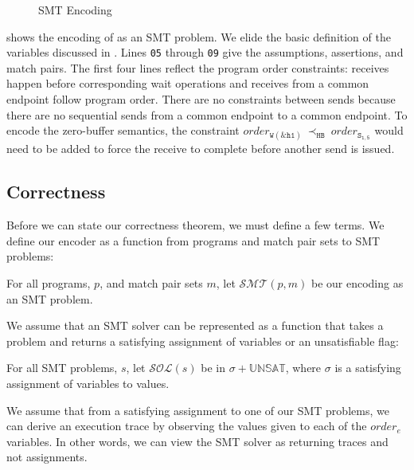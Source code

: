 \begin{figure}[t]
\begin{center}
\usebox{\boxSMTc}
\end{center}
\caption{SMT Encoding} \label{fig:smt-encode}
\end{figure}

 shows the encoding of  as an
SMT problem. We elide the basic definition of the variables discussed
in . Lines \texttt{05} through \texttt{09} give
the assumptions, assertions, and match pairs. The first four lines
reflect the program order constraints: receives happen before
corresponding wait operations and receives from a common endpoint follow
program order. There are no constraints between sends because there are no sequential sends from a common endpoint to a common endpoint. To encode the zero-buffer semantics, the constraint
$\mathit{order}_\mathtt{W(\&h1)}\ \mathrm{\prec_\mathtt{HB}}\ \mathit{order}_\mathtt{S_{1,5}}$
would need to be added to force the receive to complete before another
send is issued.

\subsection{Correctness}

Before we can state our correctness theorem, we must define a few
terms. We define our encoder as a function from programs and match pair sets
to SMT problems:

\begin{definition}[Encoder]
For all programs, $p$, and match pair sets $m$, let $\mathcal{SMT}(p,
m)$ be our encoding as an SMT problem.
\end{definition}

We assume that an SMT solver can be represented as a function that
takes a problem and returns a satisfying assignment of variables or an
unsatisfiable flag:

\begin{definition}
For all SMT problems, $s$, let $\mathcal{SOL}(s)$ be in $\sigma +
\mathbb{UNSAT}$, where $\sigma$ is a satisfying assignment of
variables to values.
\end{definition}

We assume that from a satisfying assignment to one of our SMT
problems, we can derive an execution trace by observing the values
given to each of the $\textit{order}_{e}$ variables. In other words,
we can view the SMT solver as returning traces and not assignments.

